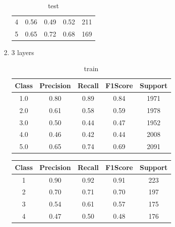 \begin{enumerate}[label=(\alph*)]
\begin{enumerate}[label=\roman*.]
\begin{table}[!htb]
\begin{tabular}{ccccc}
                            4     & 0.56      & 0.49   & 0.52    & 211     \\
                            5     & 0.65      & 0.72   & 0.68    & 169     \\ \hline
                        \end{tabular}
                        \caption{test}
                        \label{part f test depth 2}
                    \end{table}
                    \newpage
              \item 3 layers
                    \begin{table}[!htb]
                        \centering
                        \begin{tabular}{ccccc}
                            \hline
                            Class & Precision & Recall & F1Score & Support \\ \hline
                            1.0   & 0.80      & 0.89   & 0.84    & 1971    \\
                            2.0   & 0.61      & 0.58   & 0.59    & 1978    \\
                            3.0   & 0.50      & 0.44   & 0.47    & 1952    \\
                            4.0   & 0.46      & 0.42   & 0.44    & 2008    \\
                            5.0   & 0.65      & 0.74   & 0.69    & 2091    \\ \hline
                        \end{tabular}
                        \caption{train}
                        \label{part f train depth 3}
                    \end{table}
                    \begin{table}[!htb]
                        \centering
                        \begin{tabular}{ccccc}
                            \hline
                            Class & Precision & Recall & F1Score & Support \\ \hline
                            1     & 0.90      & 0.92   & 0.91    & 223     \\
                            2     & 0.70      & 0.71   & 0.70    & 197     \\
                            3     & 0.54      & 0.61   & 0.57    & 175     \\
                            4     & 0.47      & 0.50   & 0.48    & 176     \\

\end{tabular}
\end{table}
\end{enumerate}
\end{enumerate}

